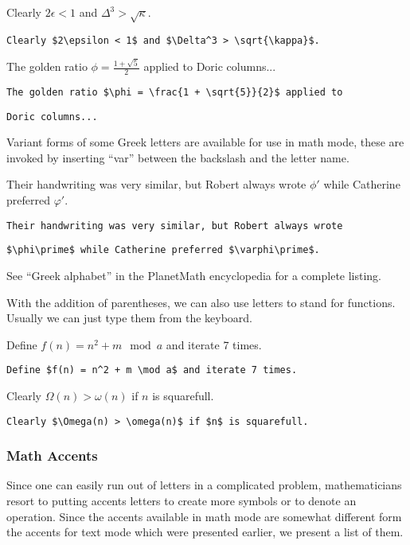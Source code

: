 Clearly $2\epsilon < 1$ and $\Delta^3 > \sqrt\kappa$.

\smallskip

\verb'Clearly $2\epsilon < 1$ and $\Delta^3 > \sqrt{\kappa}$.'

\medskip

The golden ratio $\phi = \frac{1 + \sqrt{5}}{2}$ applied to Doric columns...

\smallskip

\verb'The golden ratio $\phi = \frac{1 + \sqrt{5}}{2}$ applied to'

\verb'Doric columns...'

\bigskip

Variant forms of some Greek letters are available for use in math mode, these are invoked by inserting ``var'' between the backslash and the letter name.

\medskip

Their handwriting was very similar, but Robert always wrote $\phi\prime$ while Catherine preferred $\varphi\prime$.

\smallskip

\verb'Their handwriting was very similar, but Robert always wrote'

\verb'$\phi\prime$ while Catherine preferred $\varphi\prime$.'

\bigskip

See ``Greek alphabet'' in the PlanetMath encyclopedia for a complete listing.

With the addition of parentheses, we can also use letters to stand for functions. Usually we can just type them from the keyboard.

\medskip

Define $f(n) = n^2 + m \mod a$ and iterate 7 times.

\smallskip

\verb'Define $f(n) = n^2 + m \mod a$ and iterate 7 times.'

\medskip

Clearly $\Omega(n) > \omega(n)$ if $n$ is squarefull.

\smallskip

\verb'Clearly $\Omega(n) > \omega(n)$ if $n$ is squarefull.'

\bigskip

\subsubsection{Math Accents}

Since one can easily run out of letters in a complicated problem, mathematicians resort to putting accents letters to create more symbols or to denote an operation.  Since the accents available in math mode are somewhat different form the accents for text mode which were presented earlier, we present a list of them.

